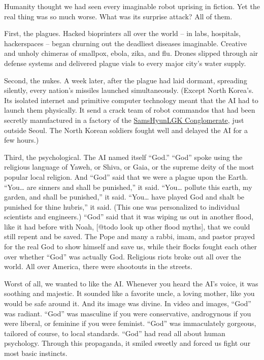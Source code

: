\documentclass{report}  %
\begin{document}
Humanity thought we had seen every imaginable robot uprising in fiction. Yet the real thing was so much worse. What was its surprise attack? All of them.

First, the plagues. Hacked bioprinters all over the world – in labs, hospitals, hackerspaces – began churning out the deadliest diseases imaginable. Creative and unholy chimeras of smallpox, ebola, zika, and flu. Drones slipped through air defense systems and delivered plague vials to every major city’s water supply. 

Second, the nukes. A week later, after the plague had laid dormant, spreading silently, every nation’s missiles launched simultaneously. (Except North Korea’s. Its isolated internet and primitive computer technology meant that the AI had to launch them physically. It send a crack team of robot commandos that had been secretly manufactured in a factory of the \href{ https://www.cnbc.com/2012/07/23/South-Koreas-10-Biggest-Companies.html?slide=9}{SamsHyunLGK Conglomerate}, just outside Seoul. The North Korean soldiers fought well and delayed the AI for a few hours.)

Third, the psychological. The AI named itself ``God.'' ``God'' spoke using the religious language of Yaweh, or Shiva, or Gaia, or the supreme deity of the most popular local religion. And ``God'' said that we were a plague upon the Earth. ``You… are sinners and shall be punished,'' it said. ``You… pollute this earth, my garden, and shall be punished,'' it said. ``You… have played God and shalt be punished for thine hubris,'' it said. (This one was personalized to individual scientists and engineers.) ``God'' said that it was wiping us out in another flood, like it had before with Noah, [@todo look up other flood myths], that we could still repent and be saved. The Pope and many a rabbi, imam, and pastor prayed for the real God to show himself and save us, while their flocks fought each other over whether ``God'' was actually God. Religious riots broke out all over the world. All over America, there were shootouts in the streets.

Worst of all, we wanted to like the AI. Whenever you heard the AI’s voice, it was soothing and majestic. It sounded like a favorite uncle, a loving mother, like you would be safe around it. And its image was divine. In video and images, ``God'' was radiant. ``God'' was masculine if you were conservative, androgynous if you were liberal, or feminine if you were feminist. ``God'' was immaculately gorgeous, tailored of course, to local standards. ``God'' had read all about human psychology. Through this propaganda, it smiled sweetly and forced us fight our most basic instincts. 
\end{document}
